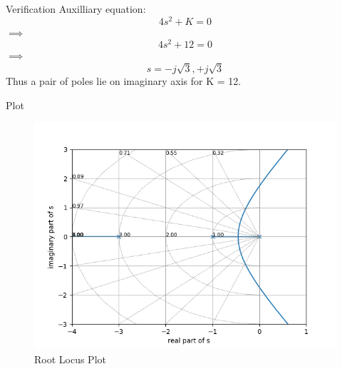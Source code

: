 \documentclass{beamer}
\begin{document}
\begin{frame}{Verification}
Auxilliary equation:
\[4s^2 + K = 0\]
$\implies$ \[ 4s^2 + 12 = 0\] 
$\implies$ \[ s = -j\sqrt{3},+j\sqrt{3} \] \newline
Thus a pair of poles lie on imaginary axis for K = 12.


\end{frame}


\begin{frame}{Plot}
\begin{figure}
\includegraphics[width=250 pt]{Root_Locus.png}
\caption{\label{fig:your-figure}Root Locus Plot}
\end{figure}


\end{frame}
\end{document}
